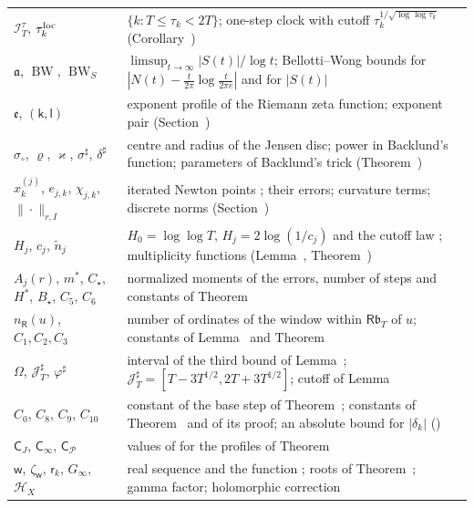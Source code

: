 \documentclass[preprint,12pt]{elsarticle}
\makeatletter
\let\CG@origref\ref
\let\CG@origeqref\eqref
\newcommand{\CG@gettip}[1]{\@ifundefined{CGTip@#1}{Reference: #1}{\csname CGTip@#1\endcsname}}
\DeclareRobustCommand{\CGref}[1]{\pdftooltip{\CG@origref{#1}}{\CG@gettip{#1}}}
\DeclareRobustCommand{\CGeqref}[1]{\pdftooltip{\CG@origeqref{#1}}{\CG@gettip{#1}}}
\numberwithin{equation}{section}
\theoremstyle{plain}
\theoremstyle{definition}
\theoremstyle{remark}
\newcommand{\BW}{\operatorname{BW}}
\newcommand{\BWS}{\operatorname{BW}_S}
\makeatother
\begin{document}
\begin{center}
\begin{longtable}{p{}p{}}
$\mathcal I_T^\tau$, $\tau_k^{\rm loc}$ & $\{k:T\le\tau_k<2T\}$; one-step clock with cutoff $\tau_k^{1/\sqrt{\log\log\tau_k}}$ (Corollary~\CGref{cor:local_clock})\\
$\mathfrak a$, $\BW$, $\BWS$ & $\limsup_{t\to\infty}|S(t)|/\log t$; Bellotti--Wong bounds for $|N(t)-\frac t{2\pi}\log\frac t{2\pi e}|$ and for $|S(t)|$ \CGeqref{eq:BWS_def}\\
$\mathfrak e$, $(\mathsf k,\mathsf l)$ & exponent profile of the Riemann zeta function; exponent pair (Section~\CGref{sec:envelope})\\
$\sigma_\circ$, $\varrho$, $\varkappa$, $\sigma^\sharp$, $\delta^\sharp$ & centre and radius of the Jensen disc; power in Backlund's function; parameters of Backlund's trick (Theorem~\CGref{thm:known_backlund})\\
$x^{(j)}_k$, $e_{j,k}$, $\chi_{j,k}$, $\|\cdot\|_{r,I}$ & iterated Newton points \CGeqref{eq:newton_iteration}; their errors; curvature terms; discrete norms (Section~\CGref{sec:iteration})\\
$H_j$, $c_j$, $\tilde n_j$ & $H_0=\log\log T$, $H_j=2\log(1/c_j)$ and the cutoff law \CGeqref{eq:cutoff_law}; multiplicity functions (Lemma~\CGref{lem:multiplicity}, Theorem~\CGref{thm:multiplicity_all})\\
$A_j(r)$, $m^*$, $C_\star$, $H^*$, $B_\star$, $C_5$, $C_6$ & normalized moments of the errors, number of steps and constants of Theorem~\CGref{thm:uniform_iteration}\\
$n_{\mathsf R}(u)$, $C_1,C_2,C_3$ & number of ordinates of the window within $\mathsf R\mathfrak b_T$ of $u$; constants of Lemma~\CGref{lem:zero_pairs} and Theorem~\CGref{thm:multiplicity_all}\\
$\Omega$, $\mathcal J_T^\sharp$, $\varphi^\sharp$ & interval of the third bound of Lemma~\CGref{lem:higher_moments}; $\mathcal J_T^\sharp=[T-3T^{1/2},2T+3T^{1/2}]$; cutoff of Lemma~\CGref{lem:sampling_rho}\\
$C_0$, $C_8$, $C_9$, $C_{10}$ & constant of the base step of Theorem~\CGref{thm:uniform_iteration}; constants of Theorem~\CGref{thm:tails} and of its proof; an absolute bound for $|\delta_k|$ (\CGeqref{eq:BW_pointwise})\\
$\mathsf C_J$, $\mathsf C_\infty$, $\mathsf C_{\mathcal P}$ & values of \CGeqref{eq:envelope_formula} for the profiles of Theorem~\CGref{thm:envelope}\\
$\mathsf w$, $\zeta_{\mathsf w}$, $\mathsf r_k$, $G_\infty$, $\mathcal H_X$ & real sequence and the function \CGeqref{eq:zeta_kappa}; roots of Theorem~\CGref{thm:euler_product}; gamma factor; holomorphic correction \CGeqref{eq:euler_product}\\

\end{longtable}
\end{center}
\end{document}

